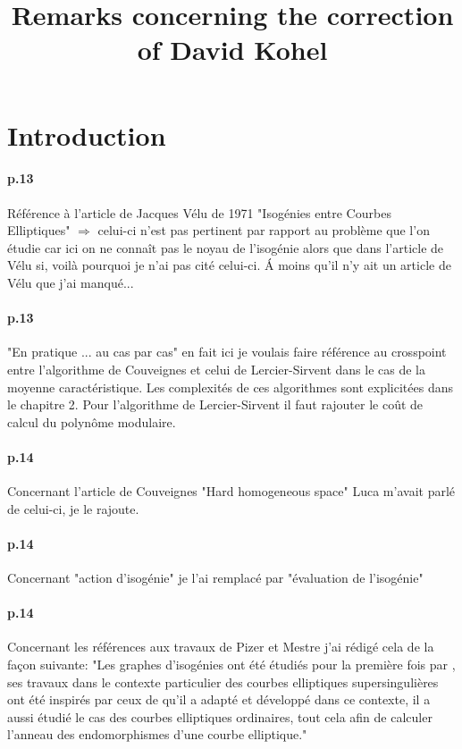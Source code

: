 \documentclass[10pt,a4paper]{article}
\title{Remarks concerning the correction of David Kohel}
\theoremstyle{plain}
\theoremstyle{definition}
\theoremstyle{definition}
\theoremstyle{definition}
\theoremstyle{definition}
\theoremstyle{definition}
\theoremstyle{remark}
\theoremstyle{remark}
\theoremstyle{definition}
\begin{document}
\maketitle
\section{Introduction}
\paragraph{p.13}{Référence à l'article de Jacques Vélu de 1971 "Isogénies entre Courbes Elliptiques" $\Rightarrow$  celui-ci n'est pas pertinent par rapport au problème que l'on étudie car ici on ne connaît pas le noyau de l'isogénie alors que dans l'article de Vélu si, voilà pourquoi je n'ai pas cité celui-ci. \'A moins qu'il n'y ait un article de Vélu que j'ai manqué...}
\paragraph{p.13}{"En pratique ... au cas par cas" en fait ici je voulais faire référence au crosspoint entre l'algorithme de Couveignes et celui de Lercier-Sirvent dans le cas de la moyenne caractéristique. Les complexités de ces algorithmes sont explicitées dans le chapitre 2. Pour l'algorithme de Lercier-Sirvent il faut rajouter le coût de calcul du polynôme modulaire.}
\paragraph{p.14}{Concernant l'article de Couveignes "Hard homogeneous space" Luca m'avait parlé de celui-ci, je le rajoute.}

\paragraph{p.14}{Concernant "action d'isogénie" je l'ai remplacé par "évaluation de l'isogénie"}

\paragraph{p.14}{Concernant les références aux travaux de Pizer et Mestre j'ai rédigé cela de la façon suivante: "Les graphes d'isogénies ont été étudiés pour la première fois par 
\cite{Kohel96}, ses travaux dans le contexte particulier des courbes elliptiques
supersingulières ont été inspirés par ceux de \cite{Mestre86,Pizer90,Pizer95} 
qu'il a adapté et développé dans ce contexte, il a aussi étudié le cas des 
courbes elliptiques ordinaires, tout cela afin de calculer l'anneau des 
endomorphismes d'une courbe 
elliptique."}
\end{document}
